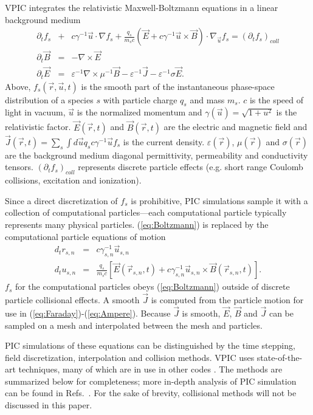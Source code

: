 \documentclass[letter,10pt]{article}
\newcommand{\eps}{\varepsilon}
\newcommand{\vecr}{\vec{r}}
\newcommand{\vecu}{\vec{u}}
\newcommand{\vecJ}{\vec{J}}
\newcommand{\vecE}{\vec{E}}
\newcommand{\vecB}{\vec{B}}
\newcommand{\Deriv}[2]{d_{#2}#1}
\newcommand{\PDeriv}[2]{\partial_{#2}#1}
\newcommand{\DotP}[2]{#1 \cdot #2}
\newcommand{\CrossP}[2]{#1 \times #2}
\newcommand{\Grad}[1]{\nabla #1}
\newcommand{\Curl}[1]{\nabla \times #1}
\newcommand{\Gradu}[1]{\nabla_{\vecu} #1}
\newcommand{\eq}[1]{(\ref{eq:#1})}
\begin{document}
VPIC integrates the relativistic Maxwell-Boltzmann equations in a linear background medium
\begin{eqnarray}
\PDeriv{f_s}{t} &+& 
\DotP{c\gamma^{-1}\vecu}{\Grad{f_s}} +
\DotP{\frac{q_s}{m_s c}\left(\vecE+\CrossP{c\gamma^{-1}\vecu}{\vecB}\right)}
{\Gradu{f_s}} = \left(\PDeriv{f_s}{t}\right)_{coll} \label{eq:Boltzmann}\\
\PDeriv{\vecB}{t} &=& -\Curl{\vecE} \label{eq:Faraday}\\
\PDeriv{\vecE}{t} &=&
\eps^{-1}\Curl{\mu^{-1}\vecB} - \eps^{-1}\vecJ - \eps^{-1}\sigma\vecE
\label{eq:Ampere}
.
\end{eqnarray}
Above, $f_s\left(\vecr,\vecu,t\right)$ is the smooth part of the
instantaneous phase-space distribution of a species $s$ with particle
charge $q_s$ and mass $m_s$.  $c$ is the speed of light in vacuum,
$\vecu$ is the normalized momentum and $\gamma\left(\vecu\right) =
\sqrt{1 + u^2}$ is the relativistic factor.
$\vecE\left(\vecr,t\right)$ and $\vecB\left(\vecr,t\right)$ are the
electric and magnetic field and $\vecJ\left(\vecr,t\right) =
\sum_s \int d\vecu q_s c\gamma^{-1}\vecu f_s$ is the current
density.  $\eps\left(\vecr\right)$, $\mu\left(\vecr\right)$ and
$\sigma\left(\vecr\right)$ are the background medium diagonal
permittivity, permeability and conductivity tensors.
$\left(\PDeriv{f_s}{t}\right)_{coll}$ represents discrete
particle effects (e.g. short range Coulomb collisions, excitation and
ionization).

Since a direct discretization of $f_s$ is prohibitive, PIC simulations
sample it with a collection of computational particles---each
computational particle typically represents many physical particles.
\eq{Boltzmann} is replaced by the computational particle
equations of motion
\begin{eqnarray}
\Deriv{r_{s,n}}{t} &=& c \gamma_{s,n}^{-1} \vecu_{s,n} \label{eq:Position}\\
\Deriv{u_{s,n}}{t} &=& \frac{q_s}{m_s c} \left[
\vecE\left(\vecr_{s,n},t\right) +
\CrossP{c\gamma_{s,n}^{-1}\vecu_{s,n}}{\vecB\left(\vecr_{s,n},t\right)}
\right] \label{eq:Momentum}
.
\end{eqnarray}
$f_s$ for the computational particles obeys \eq{Boltzmann} outside of
discrete particle collisional effects.  A smooth $\vecJ$ is computed
from the particle motion for use in \eq{Faraday}-\eq{Ampere}.  Because
$\vecJ$ is smooth, $\vecE$, $\vecB$ and $\vecJ$ can be sampled on a
mesh and interpolated between the mesh and particles.

PIC simulations of these equations can be distinguished by the time
stepping, field discretization, interpolation and collision methods.
VPIC uses state-of-the-art techniques, many of which are in use in
other codes
\cite{Kwan_Snell_1985,Verboncoeur_et_al_1995,Eastwood_et_al_1995,Jones_et_al_1996,Blahovec_et_al_2000,Nieter_Cary_2004}.
The methods are summarized below for completeness; more in-depth
analysis of PIC simulation can be found in
Refs.~\cite{Birdsall_Langdon_1985,Hockney_Eastwood_1988}.  For the
sake of brevity, collisional methods will not be discussed in this
paper.
\end{document}
